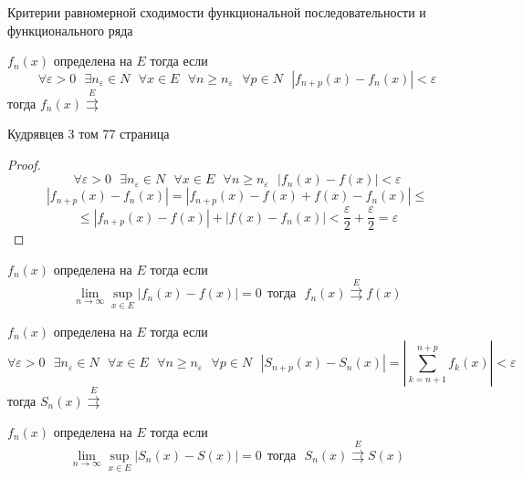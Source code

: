 \begin{title}[\Large]
  Критерии равномерной сходимости функциональной последовательности и
  функционального ряда
\end{title}

\begin{block}
  $f_n(x)$ определена на $E$ тогда если
  $$
  \forall \varepsilon > 0 ~~~ \exists n_{\varepsilon} \in N ~~~
  \forall x \in E ~~~ \forall n \ge n_{\varepsilon} ~~~ \forall p \in N ~~~
  |f_{n+p}(x) - f_n(x)| < \varepsilon
  $$
  тогда $f_n(x) \stackrel{E}{\rightrightarrows}$

  Кудрявцев 3 том 77 страница
\end{block}

\begin{proof}
  $$
  \forall \varepsilon > 0 ~~~ \exists n_{\varepsilon} \in N ~~~
  \forall x \in E ~~~ \forall n \ge n_{\varepsilon} ~~~
  |f_n(x) - f(x)| < \varepsilon
  $$
  $$
  |f_{n+p}(x) - f_n(x)| = |f_{n+p}(x) - f(x) + f(x) - f_n(x)| \le
  $$
  $$
  \le |f_{n+p}(x) - f(x)| + |f(x) - f_n(x)| < \frac{\varepsilon}{2} +
  \frac{\varepsilon}{2} = \varepsilon
  $$
\end{proof}

\begin{block}
  $f_n(x)$ определена на $E$ тогда если
  $$
  \lim_{n \to \infty} \sup\limits_{x \in E} |f_n(x) - f(x)| = 0 ~~ \text{тогда}
  ~~~ f_n(x) \stackrel{E}{\rightrightarrows} f(x)
  $$
\end{block}

\begin{block}
  $f_n(x)$ определена на $E$ тогда если
  $$
  \forall \varepsilon > 0 ~~~ \exists n_{\varepsilon} \in N ~~~
  \forall x \in E ~~~ \forall n \ge n_{\varepsilon} ~~~ \forall p \in N ~~~
  |S_{n+p}(x) - S_n(x)| = \left| \sum_{k = n + 1}^{n+p} f_k(x) \right|
  < \varepsilon
  $$
  тогда $S_n(x) \stackrel{E}{\rightrightarrows}$
\end{block}

\begin{block}
  $f_n(x)$ определена на $E$ тогда если
  $$
  \lim_{n \to \infty} \sup\limits_{x \in E} |S_n(x) - S(x)| = 0 ~~ \text{тогда}
  ~~~ S_n(x) \stackrel{E}{\rightrightarrows} S(x)
  $$
\end{block}

